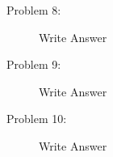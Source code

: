 \documentclass[12pt]{article}
\begin{document}
\begin{description}
  \pagebreak

  \item[Problem 8:] \hfill %
  
  Write Answer

  \pagebreak

  \item[Problem 9:] \hfill %
  
  Write Answer

  \pagebreak

  \item[Problem 10:] \hfill %
  
  Write Answer

  \pagebreak
  
\end{description}
\end{document}
